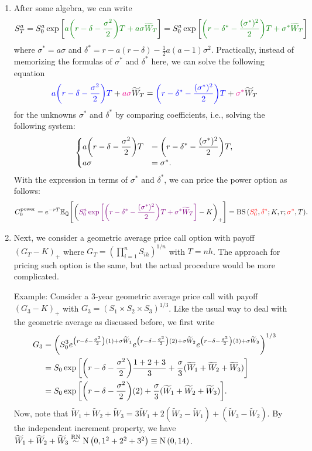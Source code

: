 \begin{enumerate}
\item After some algebra, we can write
\[
S_T^{a}=S_0^{a}\exp\qty[\gc{a\qty(r-\delta-\frac{\sigma^2}{2})T+a\sigma\widetilde{W}_T}]
=S_0^{a}\exp\qty[\gc{\qty(r-\delta^{*}-\frac{(\sigma^{*})^2}{2})T+\sigma^{*}\widetilde{W}_T}]
\]
where \(\sigma^{*}=a\sigma\) and
\(\delta^*=r-a(r-\delta)-\frac{1}{2}a(a-1)\sigma^2\). Practically, instead of
memorizing the formulas of \(\sigma^*\) and \(\delta^*\) here, we can solve the
following equation
\[
{\color{blue}a\qty(r-\delta-\frac{\sigma^2}{2})T}+{\color{magenta}a\sigma}\widetilde{W}_T
={\color{blue}\qty(r-\delta^{*}-\frac{(\sigma^{*})^2}{2})T}+{\color{magenta}\sigma^{*}}\widetilde{W}_T
\]
for the unknowns \(\sigma^*\) and \(\delta^*\) by comparing coefficients, i.e.,
solving the following system:
\[
\begin{cases}
\displaystyle a\qty(r-\delta-\frac{\sigma^2}{2})T&=\displaystyle \qty(r-\delta^{*}-\frac{(\sigma^{*})^2}{2})T,\\
a\sigma&=\sigma^{*}.
\end{cases}
\]
With the expression in terms of \(\sigma^*\) and \(\delta^*\), we can price the
power option as follows:
\[
C_0^{\mathrm{power}}=e^{-rT}\mathbb{E}_{\mathbb{Q}}\qty[\qty({\color{violet}S_0^{a}\exp\qty[\qty(r-\delta^{*}-\frac{(\sigma^{*})^2}{2})T+\sigma^{*}\widetilde{W}_T]}-K)_{+}]
=\operatorname{BS}\qty({\color{red}S_0^a},{\color{red}\delta^*};K,r;{\color{red}\sigma^*},T).
\]

\item Next, we consider a geometric average price call option with payoff
\((G_T-K)_{+}\) where \(G_T=(\prod_{i=1}^{n}S_{ih})^{1/n}\) with \(T=nh\). The
approach for pricing such option is the same, but the actual procedure would be
more complicated.

Example: Consider a 3-year geometric average price call with payoff
\((G_3-K)_{+}\) with \(G_3=(S_1\times S_2\times S_3)^{1/3}\). Like the usual
way to deal with the geometric average as discussed before, we first write
\begin{align*}
G_3&=\qty(S_0^{3}e^{\qty(r-\delta-\frac{\sigma^2}{2})(1)+\sigma\widetilde{W}_1}
e^{\qty(r-\delta-\frac{\sigma^2}{2})(2)+\sigma\widetilde{W}_2}
e^{\qty(r-\delta-\frac{\sigma^2}{2})(3)+\sigma\widetilde{W}_3}
)^{1/3} \\
&=S_0\exp\qty[\qty(r-\delta-\frac{\sigma^2}{2})\frac{1+2+3}{3}+\frac{\sigma}{3}(\widetilde{W}_1+\widetilde{W}_2+\widetilde{W}_3)] \\
&=S_0\exp\qty[\qty(r-\delta-\frac{\sigma^2}{2})(2)+\frac{\sigma}{3}(\widetilde{W}_1+\widetilde{W}_2+\widetilde{W}_3)].
\end{align*}
Now, note that \(\widetilde{W}_1+\widetilde{W}_2+\widetilde{W}_3
=3\widetilde{W}_1+2(\widetilde{W}_2-\widetilde{W}_1)+(\widetilde{W}_3-\widetilde{W}_2)\).
By the independent increment property, we have
\(\widetilde{W}_1+\widetilde{W}_2+\widetilde{W}_3\overset{\mathrm{RN}}{\sim}\operatorname{N}\qty(0,1^2+2^2+3^2)\equiv\operatorname{N}\qty(0,14)\).


\end{enumerate}
